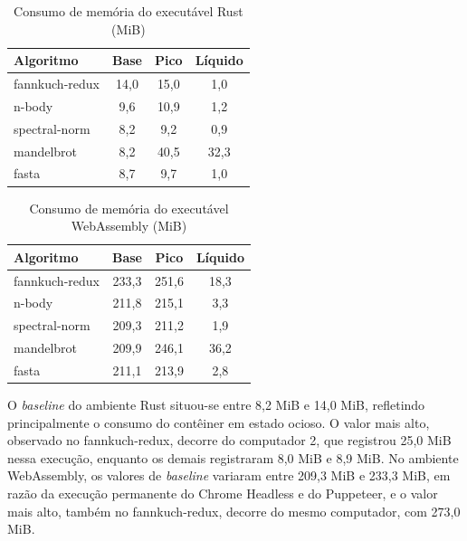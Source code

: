 \begin{table}[!h]
    \caption{Consumo de memória do executável Rust (MiB)}
    \label{tab:memoria-rust}
    \centering
    \setlength{\tabcolsep}{6pt}
    \begin{tabular}{lccc}
        \hline
        Algoritmo & Base & Pico & Líquido \\
        \hline
        fannkuch-redux  & 14,0 & 15,0 & 1,0 \\
        n-body          & 9,6 & 10,9 & 1,2 \\
        spectral-norm   & 8,2 & 9,2 & 0,9 \\
        mandelbrot      & 8,2 & 40,5 & 32,3 \\
        fasta           & 8,7 & 9,7 & 1,0 \\
        \hline
    \end{tabular}
\end{table}

\begin{table}[!h]
    \caption{Consumo de memória do executável WebAssembly (MiB)}
    \label{tab:memoria-wasm}
    \centering
    \setlength{\tabcolsep}{6pt}
    \begin{tabular}{lccc}
        \hline
        Algoritmo & Base & Pico & Líquido \\
        \hline
        fannkuch-redux  & 233,3 & 251,6 & 18,3 \\
        n-body          & 211,8 & 215,1 & 3,3 \\
        spectral-norm   & 209,3 & 211,2 & 1,9 \\
        mandelbrot      & 209,9 & 246,1 & 36,2 \\
        fasta           & 211,1 & 213,9 & 2,8 \\
        \hline
    \end{tabular}
\end{table}

O \emph{baseline} do ambiente Rust situou-se entre 8,2 MiB e 14,0 MiB, refletindo principalmente o consumo do contêiner em estado ocioso. O valor mais alto, observado no fannkuch-redux, decorre do computador 2, que registrou 25,0 MiB nessa execução, enquanto os demais registraram 8,0 MiB e 8,9 MiB. No ambiente WebAssembly, os valores de \emph{baseline} variaram entre 209,3 MiB e 233,3 MiB, em razão da execução permanente do Chrome Headless e do Puppeteer, e o valor mais alto, também no fannkuch-redux, decorre do mesmo computador, com 273,0 MiB.

